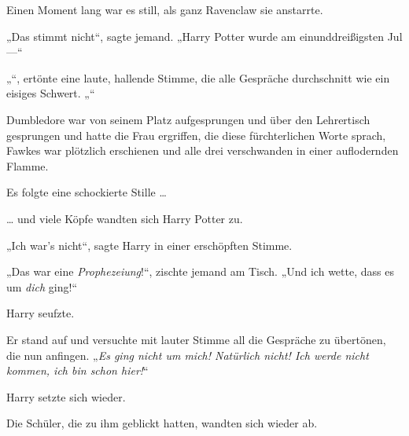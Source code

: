 Einen Moment lang war es still, als ganz Ravenclaw sie anstarrte.

„Das stimmt nicht“, sagte jemand.
„Harry Potter wurde am einunddreißigsten Jul —“

„“, ertönte eine laute, hallende Stimme, die alle Gespräche durchschnitt wie ein eisiges Schwert. „“

Dumbledore war von seinem Platz aufgesprungen und über den Lehrertisch gesprungen und hatte die Frau ergriffen, die diese fürchterlichen Worte sprach, Fawkes war plötzlich erschienen und alle drei verschwanden in einer auflodernden Flamme.

Es folgte eine schockierte Stille …

… und viele Köpfe wandten sich Harry Potter zu.

„Ich war’s nicht“, sagte Harry in einer erschöpften Stimme.

„Das war eine \emph{Prophezeiung}!“, zischte jemand am Tisch.
„Und ich wette, dass es um \emph{dich} ging!“

Harry seufzte.

Er stand auf und versuchte mit lauter Stimme all die Gespräche zu übertönen, die nun anfingen.
„\emph{Es ging nicht um mich! Natürlich nicht! Ich werde nicht kommen, ich bin schon hier!}“

Harry setzte sich wieder.

Die Schüler, die zu ihm geblickt hatten, wandten sich wieder ab.

